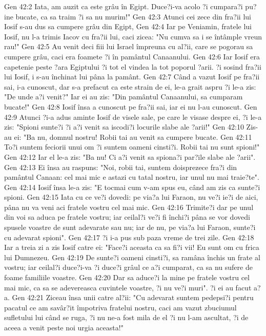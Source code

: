 Gen 42:2  Iata, am auzit ca este grâu în Egipt. Duce?i-va acolo ?i cumpara?i pu?ine bucate, ca sa traim ?i sa nu murim!"
Gen 42:3  Atunci cei zece din fra?ii lui Iosif s-au dus sa cumpere grâu din Egipt,
Gen 42:4  Iar pe Veniamin, fratele lui Iosif, nu l-a trimis Iacov cu fra?ii lui, caci zicea: "Nu cumva sa i se întâmple vreun rau!"
Gen 42:5  Au venit deci fiii lui Israel împreuna cu al?ii, care se pogorau sa cumpere grâu, caci era foamete ?i în pamântul Canaanului.
Gen 42:6  Iar Iosif era capetenie peste ?ara Egiptului ?i tot el vindea la tot poporul ?arii. ?i sosind fra?ii lui Iosif, i s-au închinat lui pâna la pamânt.
Gen 42:7  Când a vazut Iosif pe fra?ii sai, i-a cunoscut, dar s-a prefacut ca este strain de ei, le-a grait aspru ?i le-a zis: "De unde a?i venit?" Iar ei au zis: "Din pamântul Canaanului, sa cumparam bucate!"
Gen 42:8  Iosif însa a cunoscut pe fra?ii sai, iar ei nu l-au cunoscut.
Gen 42:9  Atunci ?i-a adus aminte Iosif de visele sale, pe care le visase despre ei, ?i le-a zis: "Spioni sunte?i ?i a?i venit sa iscodi?i locurile slabe ale ?arii!"
Gen 42:10  Zis-au ei: "Ba nu, domnul nostru! Robii tai au venit sa cumpere bucate.
Gen 42:11  To?i suntem feciorii unui om ?i suntem oameni cinsti?i. Robii tai nu sunt spioni!"
Gen 42:12  Iar el le-a zis: "Ba nu! Ci a?i venit sa spiona?i par?ile slabe ale ?arii".
Gen 42:13  Ei însa au raspuns: "Noi, robii tai, suntem doisprezece fra?i din pamântul Canaan: cel mai mic e astazi cu tatal nostru, iar unul nu mai traie?te".
Gen 42:14  Iosif însa le-a zis: "E tocmai cum v-am spus eu, când am zis ca sunte?i spioni.
Gen 42:15  Iata cu ce ve?i dovedi: pe via?a lui Faraon, nu ve?i ie?i de aici, pâna nu va veni aci fratele vostru cel mai mic.
Gen 42:16  Trimite?i dar pe unul din voi sa aduca pe fratele vostru; iar ceilal?i ve?i fi închi?i pâna se vor dovedi spusele voastre de sunt adevarate sau nu; iar de nu, pe via?a lui Faraon, sunte?i cu adevarat spioni".
Gen 42:17  ?i i-a pus sub paza vreme de trei zile.
Gen 42:18  Iar a treia zi a zis Iosif catre ei: "Face?i aceasta ca sa fi?i vii! Eu sunt om cu frica lui Dumnezeu.
Gen 42:19  De sunte?i oameni cinsti?i, sa ramâna închis un frate al vostru; iar ceilal?i duce?i-va ?i duce?i grâul ce a?i cumparat, ca sa nu sufere de foame familiile voastre.
Gen 42:20  Dar sa aduce?i la mine pe fratele vostru cel mai mic, ca sa se adevereasca cuvintele voastre, ?i nu ve?i muri". ?i ei au facut a?a.
Gen 42:21  Ziceau însa unii catre al?ii: "Cu adevarat suntem pedepsi?i pentru pacatul ce am savâr?it împotriva fratelui nostru, caci am vazut zbuciumul sufletului lui când se ruga, ?i nu ne-a fost mila de el ?i nu l-am ascultat, ?i de aceea a venit peste noi urgia aceasta!"
